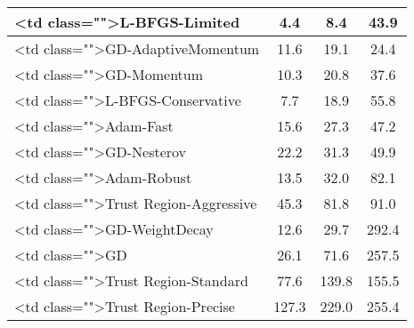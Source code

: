 \documentclass{article}
\begin{document}
\begin{tabular}{|l|c|c|c|}
                <td class="">L-BFGS-Limited & 
                4.4 & 
                8.4 & 
                43.9 & 
             \\
\hline
            
                <td class="">GD-AdaptiveMomentum & 
                11.6 & 
                19.1 & 
                24.4 & 
             \\
\hline
            
                <td class="">GD-Momentum & 
                10.3 & 
                20.8 & 
                37.6 & 
             \\
\hline
            
                <td class="">L-BFGS-Conservative & 
                7.7 & 
                18.9 & 
                55.8 & 
             \\
\hline
            
                <td class="">Adam-Fast & 
                15.6 & 
                27.3 & 
                47.2 & 
             \\
\hline
            
                <td class="">GD-Nesterov & 
                22.2 & 
                31.3 & 
                49.9 & 
             \\
\hline
            
                <td class="">Adam-Robust & 
                13.5 & 
                32.0 & 
                82.1 & 
             \\
\hline
            
                <td class="">Trust Region-Aggressive & 
                45.3 & 
                81.8 & 
                91.0 & 
             \\
\hline
            
                <td class="">GD-WeightDecay & 
                12.6 & 
                29.7 & 
                292.4 & 
             \\
\hline
            
                <td class="">GD & 
                26.1 & 
                71.6 & 
                257.5 & 
             \\
\hline
            
                <td class="">Trust Region-Standard & 
                77.6 & 
                139.8 & 
                155.5 & 
             \\
\hline
            
                <td class="">Trust Region-Precise & 
                127.3 & 
                229.0 & 
                255.4 & 
             \\
\hline
            

\end{tabular}
\end{document}
